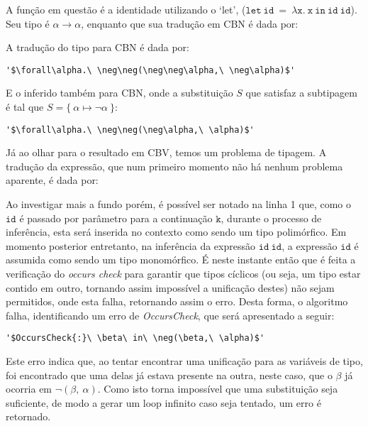 A função em questão é a identidade utilizando o `let', ($\mathtt{let\ id\ =\ \lambda x.\ x\ in\ id\ id}$).
Seu tipo é $\alpha \to \alpha$, enquanto que sua tradução em CBN é dada por:

A tradução do tipo para CBN é dada por:
\lstset{extendedchars=false, escapeinside=''}
\begin{lstlisting}[style=output,caption={Tradução em CBN da identidade com `let'}]
  '$\forall\alpha.\ \neg\neg(\neg\neg\alpha,\ \neg\alpha)$'
\end{lstlisting}
E o inferido também para CBN, onde a substituição $S$ que satisfaz a subtipagem é tal que $S = \{\ \alpha \mapsto \neg\alpha \ \}$:
\lstset{extendedchars=false, escapeinside=''}
\begin{lstlisting}[style=output,caption={Inferência da identidade com `let' traduzido em CBN}]
  '$\forall\alpha.\ \neg\neg(\neg\alpha,\ \alpha)$'
\end{lstlisting}
Já ao olhar para o resultado em CBV, temos um problema de tipagem.
A tradução da expressão, que num primeiro momento não há nenhum problema aparente, é dada por:

Ao investigar mais a fundo porém, é possível ser notado na linha 1 que, como o $\mathtt{id}$ é passado por parâmetro para a continuação $\mathtt{k}$, durante o processo de inferência, esta será inserida no contexto como sendo um tipo polimórfico.
Em momento posterior entretanto, na inferência da expressão $\mathtt{id\ id}$, a expressão $\mathtt{id}$ é assumida como sendo um tipo monomórfico.
É neste instante então que é feita a verificação do \textit{occurs check} para garantir que tipos cíclicos (ou seja, um tipo estar contido em outro, tornando assim impossível a unificação destes) não sejam permitidos, onde esta falha, retornando assim o erro.
Desta forma, o algoritmo falha, identificando um erro de \textit{OccursCheck}, que será apresentado a seguir:
\lstset{extendedchars=false, escapeinside=''}
\begin{lstlisting}[style=output,caption={Erro de Inferência da identidade com `let' traduzido em CBV}]
  '$OccursCheck{:}\ \beta\ in\ \neg(\beta,\ \alpha)$'
\end{lstlisting}
Este erro indica que, ao tentar encontrar uma unificação para as variáveis de tipo, foi encontrado que uma delas já estava presente na outra, neste caso, que o $\beta$ já ocorria em $\neg(\beta,\ \alpha)$.
Como isto torna impossível que uma substituição seja suficiente, de modo a gerar um loop infinito caso seja tentado, um erro é retornado.

